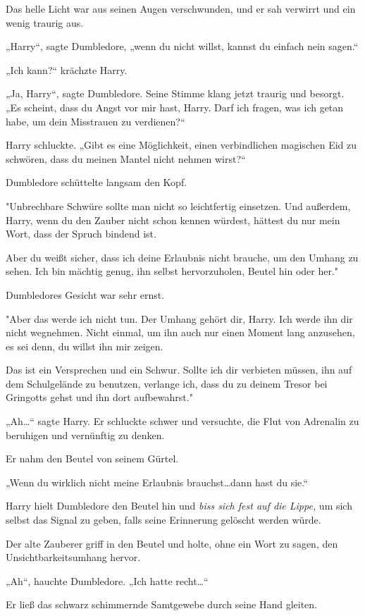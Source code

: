 {Das helle Licht war aus seinen Augen verschwunden, und er sah verwirrt und ein wenig traurig aus.

„Harry“, sagte Dumbledore, „wenn du nicht willst, kannst du einfach nein sagen.“

„Ich kann?“ krächzte Harry.

„Ja, Harry“, sagte Dumbledore. Seine Stimme klang jetzt traurig und besorgt. „Es scheint, dass du Angst vor mir hast, Harry. Darf ich fragen, was ich getan habe, um dein Misstrauen zu verdienen?“

Harry schluckte. „Gibt es eine Möglichkeit, einen verbindlichen magischen Eid zu schwören, dass du meinen Mantel nicht nehmen wirst?“

Dumbledore schüttelte langsam den Kopf.

"Unbrechbare Schwüre sollte man nicht so leichtfertig einsetzen. Und außerdem, Harry, wenn du den Zauber nicht schon kennen würdest, hättest du nur mein Wort, dass der Spruch bindend ist.

Aber du weißt sicher, dass ich deine Erlaubnis nicht brauche, um den Umhang zu sehen. Ich bin mächtig genug, ihn selbst hervorzuholen, Beutel hin oder her."

Dumbledores Gesicht war sehr ernst.

"Aber das werde ich nicht tun. Der Umhang gehört dir, Harry. Ich werde ihn dir nicht wegnehmen. Nicht einmal, um ihn auch nur einen Moment lang anzusehen, es sei denn, du willst ihn mir zeigen.

Das ist ein Versprechen und ein Schwur. Sollte ich dir verbieten müssen, ihn auf dem Schulgelände zu benutzen, verlange ich, dass du zu deinem Tresor bei Gringotts gehst und ihn dort aufbewahrst."

„Ah…“ sagte Harry. Er schluckte schwer und versuchte, die Flut von Adrenalin zu beruhigen und vernünftig zu denken.

Er nahm den Beutel von seinem Gürtel.

„Wenn du wirklich nicht meine Erlaubnis brauchst…dann hast du sie.“

Harry hielt Dumbledore den Beutel hin und \emph{biss sich fest auf die Lippe,} um sich selbst das Signal zu geben, falls seine Erinnerung gelöscht werden würde.

Der alte Zauberer griff in den Beutel und holte, ohne ein Wort zu sagen, den Unsichtbarkeitsumhang hervor.

„Ah“, hauchte Dumbledore. „Ich hatte recht…“

Er ließ das schwarz schimmernde Samtgewebe durch seine Hand gleiten.

}
